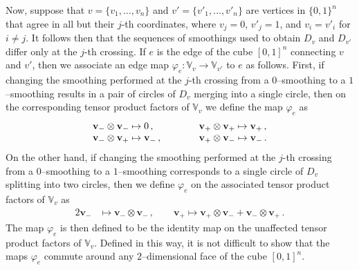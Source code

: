 \documentclass[11pt]{article}
\numberwithin{equation}{section}
\begin{document}
Now, suppose that $v=\{v_1,\ldots,v_n\}$ and $v'=\{v'_1,\ldots,v'_n\}$ are vertices in $\{0,1\}^n$ that agree in all but their $j$-th coordinates, where $v_j = 0$, $v'_j = 1$, and $v_i =v'_i$ for $i\neq j$.
It follows then that the sequences of smoothings used to obtain $D_v$ and $D_{v'}$ differ only at the $j$-th crossing.
If $e$ is the edge of the cube $[0,1]^n$ connecting $v$ and $v'$, then we associate an edge map $\varphi_e:\mathbb{V}_v \rightarrow \mathbb{V}_{v'}$ to $e$ as follows.
First, if changing the smoothing performed at the $j$-th crossing from a $0$--smoothing to a $1$--smoothing results in a pair of circles of $D_v$ merging into a single circle, then on the corresponding tensor product factors of $\mathbb{V}_v$ we define the map $\varphi_e$ as
\begin{equation}
\begin{array}{lcl}
\mathbf{v}_- \otimes \mathbf{v}_- \mapsto 0 \,, &\qquad&
\mathbf{v}_+ \otimes \mathbf{v}_+ \mapsto \mathbf{v}_+ \,, \cr
\mathbf{v}_- \otimes \mathbf{v}_+ \mapsto \mathbf{v}_- \,, &\qquad&
\mathbf{v}_+ \otimes \mathbf{v}_- \mapsto \mathbf{v}_- \,.
\end{array}
\end{equation}
On the other hand, if changing the smoothing performed at the $j$-th crossing from a $0$--smoothing to a $1$--smoothing corresponds to a single circle of $D_v$ splitting into two circles, then we define $\varphi_e$ on the associated tensor product factors of $\mathbb{V}_v$ as
\begin{alignat}{2}
\mathbf{v}_- &\mapsto \mathbf{v}_- \otimes \mathbf{v}_- \,, \qquad \mathbf{v}_+ \mapsto \mathbf{v}_+ \otimes \mathbf{v}_- + \mathbf{v}_- \otimes \mathbf{v}_+ \,.
\end{alignat}
The map $\varphi_e$ is then defined to be the identity map on the unaffected tensor product factors of $\mathbb{V}_v$.
Defined in this way, it is not difficult to show that the maps $\varphi_e$ commute around any $2$--dimensional face of the cube $\left[0,1\right]^n$.
\end{document}
